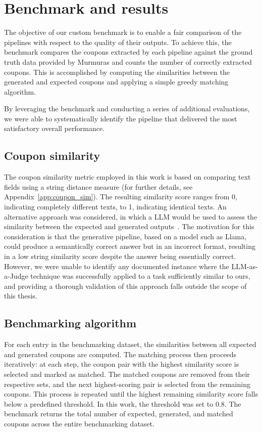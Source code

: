\documentclass[licencjacka,en]{pracamgr}
\begin{document}
\FloatBarrier

\chapter{Benchmark and results} \label{chap:benchmark}

The objective of our custom benchmark is to enable a fair comparison of the pipelines with respect to the quality of their outputs. To achieve this, the benchmark compares the coupons extracted by each pipeline against the ground truth data provided by Murmuras and counts the number of correctly extracted coupons. This is accomplished by computing the similarities between the generated and expected coupons and applying a simple greedy matching algorithm.

By leveraging the benchmark and conducting a series of additional evaluations, we were able to systematically identify the pipeline that delivered the most satisfactory overall performance.

\section{Coupon similarity}

The coupon similarity metric employed in this work is based on comparing text fields using a string distance measure (for further details, see Appendix~\ref{app:coupon_sim}). The resulting similarity score ranges from 0, indicating completely different texts, to 1, indicating identical texts. An alternative approach was considered, in which a LLM would be used to assess the similarity between the expected and generated outputs~\cite{llm-as-a-judge}. The motivation for this consideration is that the generative pipeline, based on a model such as Llama, could produce a semantically correct answer but in an incorrect format, resulting in a low string similarity score despite the answer being essentially correct. However, we were unable to identify any documented instance where the LLM-as-a-Judge technique was successfully applied to a task sufficiently similar to ours, and providing a thorough validation of this approach falls outside the scope of this thesis.

\section{Benchmarking algorithm}

For each entry in the benchmarking dataset, the similarities between all expected and generated coupons are computed. The matching process then proceeds iteratively: at each step, the coupon pair with the highest similarity score is selected and marked as matched. The matched coupons are removed from their respective sets, and the next highest-scoring pair is selected from the remaining coupons. This process is repeated until the highest remaining similarity score falls below a predefined threshold. In this work, the threshold was set to 0.8. The benchmark returns the total number of expected, generated, and matched coupons across the entire benchmarking dataset.
\end{document}

